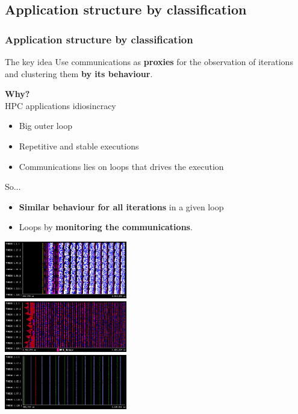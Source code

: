 \documentclass{beamer}
\begin{document}
\subsection{Application structure by classification}
\begin{frame}
\frametitle{Application structure by classification}
\begin{block}{The key idea}
	Use communications as \textbf{proxies} for the observation of iterations and clustering them \textbf{by its behaviour}.
\end{block}
\pause
\begin{multicols}{2}
	
\textbf{Why?}\\
HPC applications idiosincracy\\
\begin{itemize}
	\item Big outer loop
	\item Repetitive and stable executions
	\item Communications lies on loops that drives the execution
\end{itemize}
So...\\
\begin{itemize}
	\item \textbf{Similar behaviour for all iterations} in a given loop
	\item Loops by \textbf{monitoring the communications}.
\end{itemize}
\columnbreak


\includegraphics[width=0.4\textwidth,height=0.2\textheight]{imgs/lu_trace_128.png}\\
\includegraphics[width=0.4\textwidth,height=0.2\textheight]{imgs/cg_trace_128.png}\\
\includegraphics[width=0.4\textwidth,height=0.2\textheight]{imgs/ft_trace_128.png}

\vfill
\end{multicols}
\end{frame}
\end{document}
